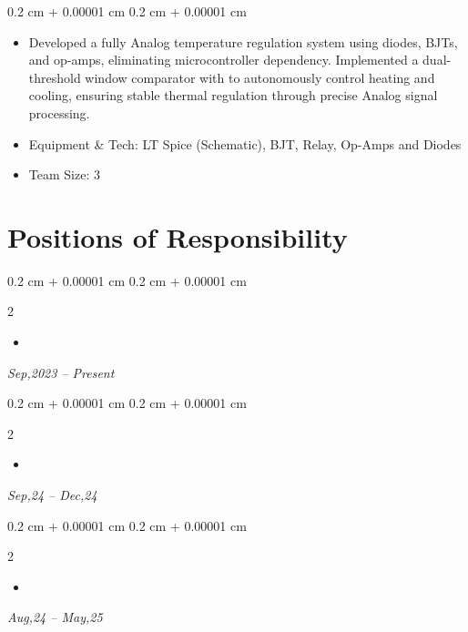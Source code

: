 \documentclass[10pt, letterpaper]{article}
\newenvironment{highlights}{
    \begin{itemize}[
        topsep=0.10 cm,
        parsep=0.10 cm,
        partopsep=0pt,
        itemsep=0pt,
        leftmargin=0.4 cm + 10pt
    ]
}{
    \end{itemize}
} %
\newenvironment{onecolentry}{
    \begin{adjustwidth}{
        0.2 cm + 0.00001 cm
    }{
        0.2 cm + 0.00001 cm
    }
}{
    \end{adjustwidth}
} %
\newenvironment{twocolentry}[2][]{
    \onecolentry
    \def\secondColumn{#2}
    \setcolumnwidth{\fill, 4.5 cm}
    \begin{paracol}{2}
}{
    \switchcolumn \raggedleft \secondColumn
    \end{paracol}
    \endonecolentry
} %
\begin{document}
        \vspace{0.10 cm}
        \begin{onecolentry}
            \begin{highlights}
                \item Developed a fully Analog temperature regulation system using diodes, BJTs, and op-amps,
eliminating microcontroller dependency. Implemented a dual-threshold window comparator
with to autonomously control heating and cooling, ensuring stable thermal regulation
through precise Analog signal processing.
                \item Equipment & Tech: LT Spice (Schematic), BJT, Relay, Op-Amps and Diodes
                \item Team Size: 3
            \end{highlights}
        \end{onecolentry}

        

    \section{Positions of Responsibility}

        \begin{twocolentry}{
            
            
        \textit{Sep,2023 – Present}}

        \begin{highlights}
                \item {} \end{highlights}
                \end{twocolentry}


         \begin{twocolentry}{

        \textit{Sep,24 – Dec,24}}
            \begin{highlights}
                \item {} \end{highlights}
        \end{twocolentry}

        \begin{twocolentry}{
        \textit{Aug,24 – May,25}}
            \begin{highlights}
                \item {} \end{highlights}
        \end{twocolentry}
\end{document}
